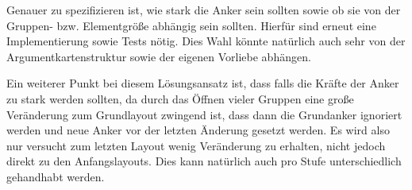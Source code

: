 Genauer zu spezifizieren ist, wie stark die Anker sein sollten sowie ob sie von der Gruppen- bzw. Elementgröße abhängig sein sollten. 
Hierfür sind erneut eine Implementierung sowie Tests nötig. Dies Wahl könnte natürlich auch sehr von der Argumentkartenstruktur sowie der eigenen Vorliebe abhängen.

Ein weiterer Punkt bei diesem Lösungsansatz ist, dass falls die Kräfte der Anker zu stark werden sollten, 
da durch das Öffnen vieler Gruppen eine große Veränderung zum Grundlayout zwingend ist, 
dass dann die Grundanker ignoriert werden und neue Anker vor der letzten Änderung gesetzt werden. 
Es wird also nur versucht zum letzten Layout wenig Veränderung zu erhalten, nicht jedoch direkt zu den Anfangslayouts. 
Dies kann natürlich auch pro Stufe unterschiedlich gehandhabt werden.


